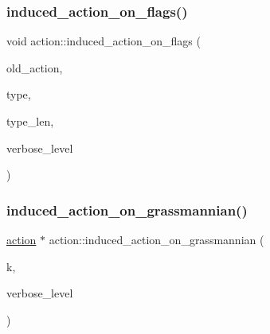\mbox{\label{classaction_afb1ac2fda2a79462e38c133330982341}} 
\subsubsection{\texorpdfstring{induced\+\_\+action\+\_\+on\+\_\+flags()}{induced\_action\_on\_flags()}}
{\footnotesize\ttfamily void action\+::induced\+\_\+action\+\_\+on\+\_\+flags (\begin{DoxyParamCaption}\item[{\mbox{\hyperlink{classaction}{action}} $\ast$}]{old\+\_\+action,  }\item[{\mbox{\hyperlink{galois_8h_a09fddde158a3a20bd2dcadb609de11dc}{I\+NT}} $\ast$}]{type,  }\item[{\mbox{\hyperlink{galois_8h_a09fddde158a3a20bd2dcadb609de11dc}{I\+NT}}}]{type\+\_\+len,  }\item[{\mbox{\hyperlink{galois_8h_a09fddde158a3a20bd2dcadb609de11dc}{I\+NT}}}]{verbose\+\_\+level }\end{DoxyParamCaption})}

\mbox{\label{classaction_a4dc271144a2899d2f94f88e52e4e538d}} 
\subsubsection{\texorpdfstring{induced\+\_\+action\+\_\+on\+\_\+grassmannian()}{induced\_action\_on\_grassmannian()}\hspace{0.1cm}{\footnotesize\ttfamily [1/2]}}
{\footnotesize\ttfamily \mbox{\hyperlink{classaction}{action}} $\ast$ action\+::induced\+\_\+action\+\_\+on\+\_\+grassmannian (\begin{DoxyParamCaption}\item[{\mbox{\hyperlink{galois_8h_a09fddde158a3a20bd2dcadb609de11dc}{I\+NT}}}]{k,  }\item[{\mbox{\hyperlink{galois_8h_a09fddde158a3a20bd2dcadb609de11dc}{I\+NT}}}]{verbose\+\_\+level }\end{DoxyParamCaption})}

